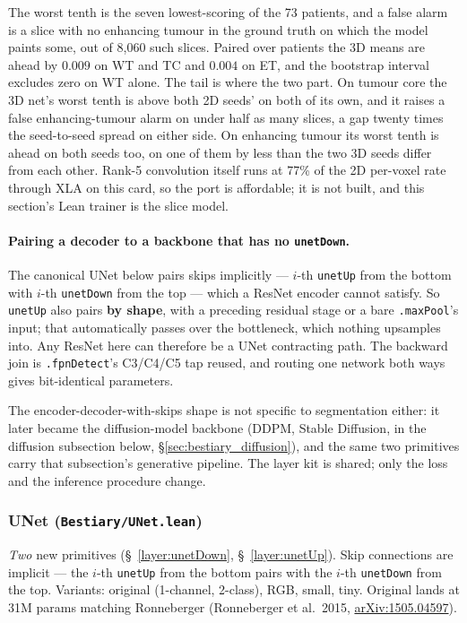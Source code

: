 \noindent The worst tenth is the seven lowest-scoring of the 73 patients, and
a false alarm is a slice with no enhancing tumour in the ground truth on which
the model paints some, out of 8{,}060 such slices. Paired over patients the
3D means are ahead by $0.009$ on WT and TC and $0.004$ on ET, and the
bootstrap interval excludes zero on WT alone. The tail is where the two
part. On tumour core the 3D net's worst tenth is above both 2D seeds' on
both of its own, and it raises a false enhancing-tumour alarm on under half
as many slices, a gap twenty times the seed-to-seed spread on either side. On
enhancing tumour its worst tenth is ahead on both seeds too, on one of them
by less than the two 3D seeds differ from each other. Rank-5 convolution itself runs at 77\% of
the 2D per-voxel rate through XLA on this card, so the port is affordable;
it is not built, and this section's Lean trainer is the slice model.

\paragraph{Pairing a decoder to a backbone that has no \texttt{unetDown}.} The
canonical UNet below pairs skips implicitly --- $i$-th \texttt{unetUp} from the
bottom with $i$-th \texttt{unetDown} from the top --- which a ResNet encoder
cannot satisfy. So \texttt{unetUp} also pairs \textbf{by shape}, with a
preceding residual stage or a bare \texttt{.maxPool}'s input; that
automatically passes over the bottleneck, which nothing upsamples into. Any
ResNet here can therefore be a UNet contracting path. The backward join is
\texttt{.fpnDetect}'s C3/C4/C5 tap reused, and routing one network both ways
gives bit-identical parameters.

The encoder-decoder-with-skips shape is not specific to segmentation
either: it later became the diffusion-model backbone (DDPM, Stable
Diffusion, in the diffusion subsection below, \S\ref{sec:bestiary_diffusion}),
and the same two primitives
carry that subsection's generative pipeline. The layer kit is shared;
only the loss and the inference procedure change.

\subsubsection*{UNet (\texttt{Bestiary/UNet.lean})}
\emph{Two} new primitives (\S~\ref{layer:unetDown},
\S~\ref{layer:unetUp}). Skip connections are implicit --- the $i$-th \texttt{unetUp} from the bottom
pairs with the $i$-th \texttt{unetDown} from the top. Variants:
original (1-channel, 2-class), RGB, small, tiny. Original lands at 31M
params matching Ronneberger (Ronneberger et al.\ 2015,
\href{https://arxiv.org/abs/1505.04597}{arXiv:1505.04597}).

